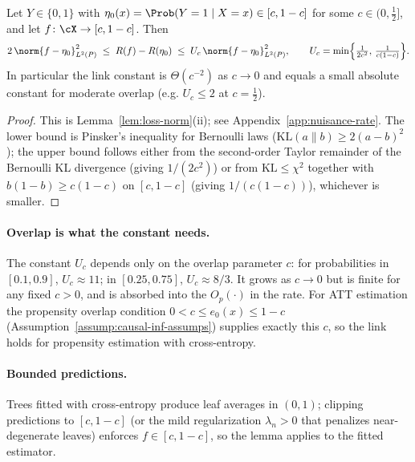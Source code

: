 \documentclass[12pt]{article}
\begin{document}
\begin{lemma}
\label{lem:ce-loss-norm}
Let $Y \in \{0,1\}$ with $\eta_0(x) = \Prob(Y=1\mid X=x) \in [c,1-c]$ for some
$c \in (0,\tfrac12]$, and let $f \colon \cX \to [c,1-c]$. Then
\[
  2\,\norm{f-\eta_0}_{L^2(P)}^2
  \;\le\; R(f) - R(\eta_0)
  \;\le\; U_c\,\norm{f-\eta_0}_{L^2(P)}^2,
  \qquad U_c = \min\Bigl\{\tfrac{1}{2c^2},\,\tfrac{1}{c(1-c)}\Bigr\}.
\]
In particular the link constant is $\Theta(c^{-2})$ as $c\to0$ and equals a
small absolute constant for moderate overlap (e.g. $U_c \le 2$ at $c=\tfrac12$).
\end{lemma}

\begin{proof}
This is Lemma~\ref{lem:loss-norm}(ii); see Appendix~\ref{app:nuisance-rate}. The
lower bound is Pinsker's inequality for Bernoulli laws
($\mathrm{KL}(a\|b)\ge 2(a-b)^2$); the upper bound follows either from the
second-order Taylor remainder of the Bernoulli KL divergence (giving $1/(2c^2)$)
or from $\mathrm{KL}\le\chi^2$ together with $b(1-b)\ge c(1-c)$ on $[c,1-c]$
(giving $1/(c(1-c))$), whichever is smaller.
\end{proof}

\paragraph{Overlap is what the constant needs.}
The constant $U_c$ depends only on the overlap parameter $c$: for probabilities
in $[0.1,0.9]$, $U_c \approx 11$; in $[0.25,0.75]$, $U_c \approx 8/3$. It grows
as $c\to0$ but is finite for any fixed $c>0$, and is absorbed into the $O_p(\cdot)$
in the rate. For ATT estimation the propensity overlap condition
$0 < c \le e_0(x) \le 1-c$ (Assumption~\ref{assump:causal-inf-assumps}) supplies
exactly this $c$, so the link holds for propensity estimation with cross-entropy.

\paragraph{Bounded predictions.}
Trees fitted with cross-entropy produce leaf averages in $(0,1)$; clipping
predictions to $[c,1-c]$ (or the mild regularization $\lambda_n>0$ that
penalizes near-degenerate leaves) enforces $f\in[c,1-c]$, so the lemma applies to
the fitted estimator.




\end{document}
